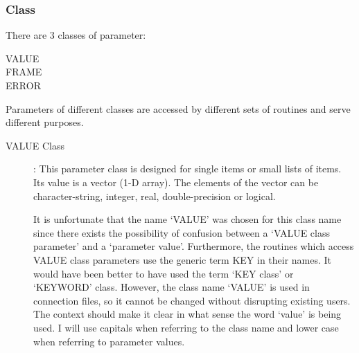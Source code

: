 \documentclass{article}
\begin{document}
\subsubsection {Class}
There are 3 classes of parameter:
\begin{description}
\item [VALUE]
\item [FRAME]
\item [ERROR]
\end{description}
Parameters of different classes are accessed by different sets of routines
and serve different purposes.
\begin{description}
\item [VALUE Class]:
This parameter class is designed for single items or small lists of items.
Its value is a vector (1-D array).
The elements of the vector can be character-string, integer, real,
double-precision or logical.

It is unfortunate that the name `VALUE' was chosen for this class name since
there exists the possibility of confusion between a `VALUE class parameter' and
a `parameter value'.
Furthermore, the routines which access VALUE class parameters use the generic
term KEY in their names.
It would have been better to have used the term `KEY class' or `KEYWORD' class.
However, the class name `VALUE' is used in connection files, so it cannot be
changed without disrupting existing users.
The context should make it clear in what sense the word `value' is being used.
I will use capitals when referring to the class name and lower case when
referring to parameter values.


\end{description}
\end{document}
